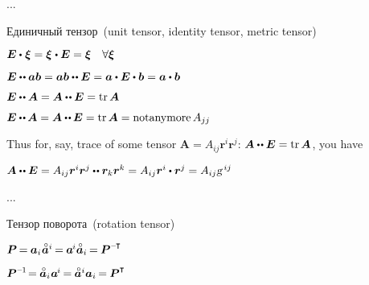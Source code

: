 \begin{otherlanguage}{russian}
\begin{tcolorbox}
\par\end{tcolorbox}

...


Единичный тензор~(unit tensor, identity tensor,  metric tensor)

$\bm{E} \dotp \hspace{0.1ex} \bm{\xi} = \bm{\xi} \hspace{0.1ex} \dotp \bm{E} = \bm{\xi} \quad \forall \bm{\xi}$

$\bm{E} \dotdotp \bm{a} \bm{b} = \bm{a} \bm{b} \dotdotp \bm{E} = \bm{a} \dotp \bm{E} \dotp \bm{b} = \bm{a} \dotp \bm{b}$

$\bm{E} \dotdotp \bm{A} = \bm{A} \dotdotp \bm{E} = \operatorname{tr} \bm{A}$


$\bm{E} \dotdotp \hspace{-0.1ex} \bm{A} = \bm{A} \dotdotp \hspace{-0.1ex} \bm{E} = \operatorname{tr} \bm{A} = \operatorname{not anymore} A_{jj}$

Thus for, say, trace of some tensor ${\bm{A} = A_{ij} \bm{r}^i \bm{r}^j}$: $\bm{A} \dotdotp \bm{E} = \operatorname{tr} \bm{A}$, you have

$\bm{A} \dotdotp \bm{E} = A_{ij} \bm{r}^i \bm{r}^j \dotdotp \bm{r}_k \bm{r}^k = A_{ij} \bm{r}^i \dotp \bm{r}^j = A_{ij} \textsl{g}^{\hspace{.32ex}ij}$


...

Тензор поворота~(rotation tensor)

$\bm{P} \hspace{-0.2ex} = \hspace{-0.1ex} \bm{a}_i \hspace{.1ex} \mathcircabove{\bm{a}}^i \hspace{-0.2ex} = \hspace{-0.1ex} \bm{a}^{\hspace{-0.16ex}i} \mathcircabove{\bm{a}}_i \hspace{-0.2ex} = \hspace{-0.1ex} \bm{P}^{\expminusT}$

$\bm{P}^{\expminusone} \hspace{-0.4ex} = \hspace{-0.1ex} \mathcircabove{\bm{a}}_i \hspace{.1ex} \bm{a}^{\hspace{-0.16ex}i} \hspace{-0.2ex} = \hspace{-0.1ex} \mathcircabove{\bm{a}}^i \bm{a}_i \hspace{-0.2ex} = \hspace{-0.1ex} \bm{P}^{\T}$


\end{otherlanguage}
